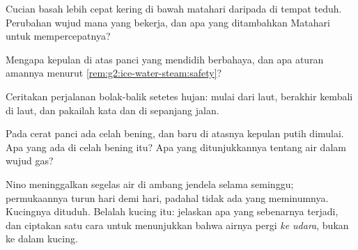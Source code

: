 \begin{exercise}[$\star$]\label{exo:g2:ice-water-steam:6}
Cucian basah lebih cepat kering di bawah matahari daripada di tempat
teduh. Perubahan wujud mana yang bekerja, dan apa yang ditambahkan
Matahari untuk mempercepatnya?
\end{exercise}

\begin{exercise}[$\star$]\label{exo:g2:ice-water-steam:7}
Mengapa kepulan di atas panci yang mendidih berbahaya, dan apa aturan
amannya menurut \cref{rem:g2:ice-water-steam:safety}?
\end{exercise}

\begin{exercise}[$\star$]\label{exo:g2:ice-water-steam:8}
Ceritakan perjalanan bolak-balik setetes hujan: mulai dari laut,
berakhir kembali di laut, dan pakailah kata  dan  di
sepanjang jalan.
\end{exercise}

\begin{exercise}[$\star\star$]\label{exo:g2:ice-water-steam:9}
Pada cerat panci ada celah bening, dan baru di atasnya kepulan putih
dimulai. Apa yang ada di celah bening itu? Apa yang ditunjukkannya
tentang air dalam wujud gas?
\end{exercise}

\begin{exercise}[$\star\star$]\label{exo:g2:ice-water-steam:10}
Nino meninggalkan segelas air di ambang jendela selama seminggu;
permukaannya turun hari demi hari, padahal tidak ada yang meminumnya.
Kucingnya dituduh. Belalah kucing itu: jelaskan apa yang sebenarnya
terjadi, dan ciptakan satu cara untuk menunjukkan bahwa airnya pergi
\emph{ke udara}, bukan ke dalam kucing.
\end{exercise}
